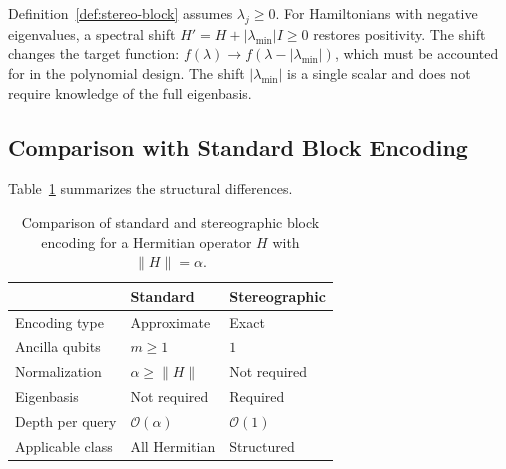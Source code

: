 \begin{remark}
	\label{rem:positivity}
	Definition~\ref{def:stereo-block} assumes
	$\lambda_j \geq 0$.  For Hamiltonians with negative
	eigenvalues, a spectral shift
	$H' = H + |\lambda_{\min}|I \geq 0$ restores positivity.
	The shift changes the target function:
	$f(\lambda) \to f(\lambda - |\lambda_{\min}|)$, which must
	be accounted for in the polynomial design.  The shift
	$|\lambda_{\min}|$ is a single scalar and does not require
	knowledge of the full eigenbasis.
\end{remark}

\subsection{Comparison with Standard Block Encoding}
\label{subsec:comparison}

Table~\ref{tab:block-comparison} summarizes the structural
differences.

\begin{table}[t]
	\caption{Comparison of standard and stereographic block
		encoding for a Hermitian operator $H$ with
		$\|H\| = \alpha$.}
	\label{tab:block-comparison}
	\begin{ruledtabular}
		\begin{tabular}{lll}
			                 & Standard              & Stereographic    \\
			\hline
			Encoding type    & Approximate           & Exact            \\
			Ancilla qubits   & $m \geq 1$            & $1$              \\
			Normalization    & $\alpha \geq \|H\|$   & Not required     \\
			Eigenbasis       & Not required          & Required         \\
			Depth per query  & $\mathcal{O}(\alpha)$ & $\mathcal{O}(1)$ \\
			Applicable class & All Hermitian         & Structured       \\
		\end{tabular}
	\end{ruledtabular}
\end{table}
